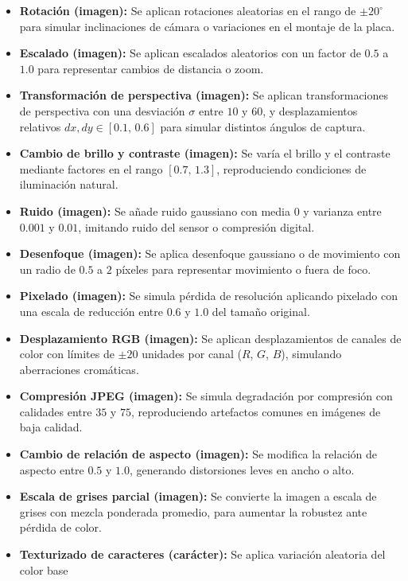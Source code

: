 \begin{itemize}
	\item \textbf{Rotación (imagen):} Se aplican rotaciones aleatorias en el rango de $\pm20^{\circ}$ 
	      para simular inclinaciones de cámara o variaciones en el montaje de la placa.
	\item \textbf{Escalado (imagen):} Se aplican escalados aleatorios con un factor de $0.5$ a $1.0$ 
	      para representar cambios de distancia o zoom.
	\item \textbf{Transformación de perspectiva (imagen):} Se aplican transformaciones de perspectiva
	      con una desviación $\sigma$ entre $10$ y $60$, y desplazamientos relativos $dx,dy \in [0.1,\,0.6]$
	      para simular distintos ángulos de captura.
	\item \textbf{Cambio de brillo y contraste (imagen):} Se varía el brillo y el contraste 
	      mediante factores en el rango $[0.7,\,1.3]$, reproduciendo condiciones de iluminación natural.
	\item \textbf{Ruido (imagen):} Se añade ruido gaussiano con media $0$ y varianza entre $0.001$ y $0.01$,
	      imitando ruido del sensor o compresión digital.
	\item \textbf{Desenfoque (imagen):} Se aplica desenfoque gaussiano o de movimiento con un radio de 
	      $0.5$ a $2$ píxeles para representar movimiento o fuera de foco.
	\item \textbf{Pixelado (imagen):} Se simula pérdida de resolución aplicando pixelado con una escala 
	      de reducción entre $0.6$ y $1.0$ del tamaño original.
	\item \textbf{Desplazamiento RGB (imagen):} Se aplican desplazamientos de canales de color con
	      límites de $\pm20$ unidades por canal ($R$, $G$, $B$), simulando aberraciones cromáticas.
	\item \textbf{Compresión JPEG (imagen):} Se simula degradación por compresión con calidades entre 
	      $35$ y $75$, reproduciendo artefactos comunes en imágenes de baja calidad.
	\item \textbf{Cambio de relación de aspecto (imagen):} Se modifica la relación de aspecto entre 
	      $0.5$ y $1.0$, generando distorsiones leves en ancho o alto.
	\item \textbf{Escala de grises parcial (imagen):} Se convierte la imagen a escala de grises con 
	      mezcla ponderada promedio, para aumentar la robustez ante pérdida de color.
	\item \textbf{Texturizado de caracteres (carácter):} Se aplica variación aleatoria del color base 

\end{itemize}
